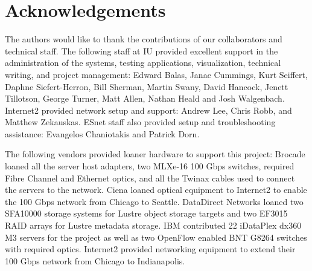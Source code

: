 \documentclass[]{sigplan-proc}
\begin{document}
\section{Acknowledgements}

The authors would like to thank the contributions of our collaborators and technical staff. The following
staff at IU provided excellent support in the administration of the systems, testing applications,
visualization, technical writing, and project management: Edward Balas, Janae Cummings, Kurt Seiffert, Daphne
Siefert-Herron, Bill Sherman, Martin Swany, David Hancock, Jenett Tillotson, George Turner, Matt Allen, Nathan Heald and Josh Walgenbach. Internet2 provided network setup and support: Andrew Lee, Chris Robb, and Matthew Zekauskas. ESnet staff also provided setup and troubleshooting assistance: Evangelos Chaniotakis and Patrick Dorn.

The following vendors provided loaner hardware to support this project: Brocade loaned all the server host
adapters, two MLXe-16 100 Gbps switches, required Fibre Channel and Ethernet optics, and all the Twinax cables
used to connect the servers to the network. Ciena loaned optical equipment to Internet2 to enable the 100 Gbps
network from Chicago to Seattle. DataDirect Networks loaned two SFA10000 storage systems for Lustre object
storage targets and two EF3015 RAID arrays for Lustre metadata storage. IBM contributed 22 iDataPlex dx360 M3
servers for the project as well as two OpenFlow enabled BNT G8264 switches with required optics. Internet2
provided networking equipment to extend their 100 Gbps network from Chicago to Indianapolis.



\end{document}
